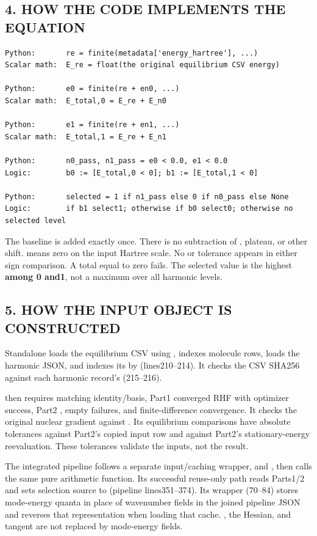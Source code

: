 \documentclass[10pt,a4paper]{article}
\begin{document}
\subsection{4. HOW THE CODE IMPLEMENTS THE EQUATION}
\begin{Verbatim}
Python:       re = finite(metadata['energy_hartree'], ...)
Scalar math:  E_re = float(the original equilibrium CSV energy)

Python:       e0 = finite(re + en0, ...)
Scalar math:  E_total,0 = E_re + E_n0

Python:       e1 = finite(re + en1, ...)
Scalar math:  E_total,1 = E_re + E_n1

Python:       n0_pass, n1_pass = e0 < 0.0, e1 < 0.0
Logic:        b0 := [E_total,0 < 0]; b1 := [E_total,1 < 0]

Python:       selected = 1 if n1_pass else 0 if n0_pass else None
Logic:        if b1 select1; otherwise if b0 select0; otherwise no selected level
\end{Verbatim}
The baseline is added exactly once. There is no subtraction of , plateau, or other shift.  means zero on the input Hartree scale. No  or tolerance appears in either sign comparison. A total equal to zero fails. The selected value is the highest \textbf{among 0 and1}, not a maximum over all harmonic levels.

\subsection{5. HOW THE INPUT OBJECT IS CONSTRUCTED}
Standalone  loads the equilibrium CSV using , indexes molecule rows, loads the harmonic JSON, and indexes its  by  (lines210–214). It checks the CSV SHA256 against each harmonic record's  (215–216).

 then requires matching identity/basis, Part1 converged RHF with optimizer success, Part2 , empty failures, and finite-difference convergence. It checks the original nuclear gradient against . Its equilibrium comparisons have absolute tolerances  against Part2's copied input row and  against Part2's stationary-energy reevaluation. These tolerances validate the inputs, not the  result.

The integrated pipeline follows a separate input/caching wrapper,  and , then calls the same pure arithmetic function. Its successful reuse-only path reads Parts1/2 and sets selection source to  (pipeline lines351–374). Its  wrapper (70–84) stores mode-energy quanta in place of wavenumber fields in the joined pipeline JSON and reverses that representation when loading that cache. , the Hessian, and tangent are not replaced by mode-energy fields.
\end{document}
